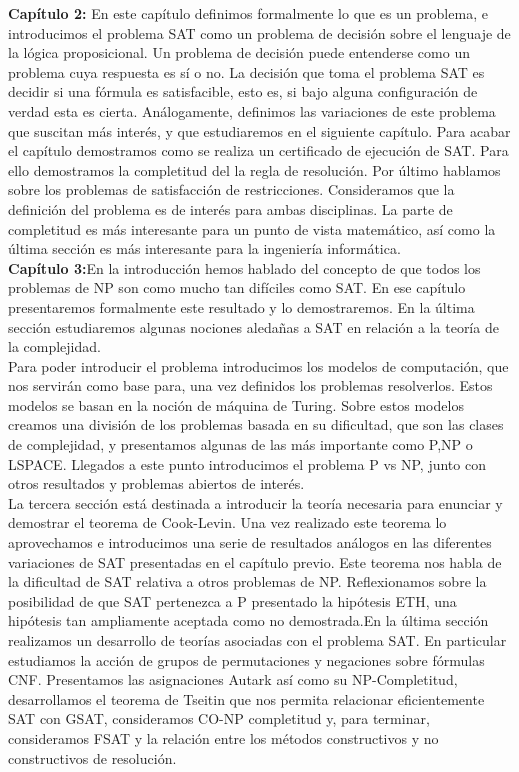\textbf{Capítulo 2:} En este capítulo definimos formalmente lo que es un problema, e introducimos el problema SAT como un problema de decisión sobre el lenguaje de la lógica proposicional. Un  problema de decisión puede entenderse como un problema cuya respuesta es sí o no. La decisión que toma el problema SAT es decidir si una fórmula es satisfacible, esto es, si bajo alguna configuración de verdad esta es cierta. Análogamente, definimos las variaciones de este problema que suscitan más interés, y que estudiaremos en el siguiente capítulo. Para acabar el capítulo demostramos como se realiza un certificado de ejecución de SAT. Para ello demostramos la completitud del la regla de resolución. Por último hablamos sobre los problemas de satisfacción de restricciones. Consideramos que la definición del problema es de interés para ambas disciplinas. La parte de completitud es más interesante para un punto de vista matemático, así como la última sección es más interesante para la ingeniería informática.\\

\textbf{Capítulo 3:}En la introducción hemos hablado del concepto de que todos los problemas de NP son como mucho tan difíciles como SAT. En ese capítulo presentaremos formalmente este resultado y lo demostraremos. En la última sección estudiaremos algunas nociones aledañas a SAT en relación a la teoría de la complejidad.\\

Para poder introducir el problema introducimos los modelos de computación, que nos servirán como base para, una vez definidos los problemas resolverlos. Estos modelos se basan en la noción de máquina de Turing. Sobre estos modelos creamos una división de los problemas basada en su dificultad, que son las clases de complejidad, y presentamos algunas de las más importante como P,NP o LSPACE. Llegados a este punto introducimos el problema P vs NP, junto con otros resultados y problemas abiertos de interés.\\


La tercera sección está destinada a introducir la teoría necesaria para enunciar y demostrar el teorema de Cook-Levin. Una vez realizado este teorema lo aprovechamos e  introducimos una serie de resultados análogos en las diferentes variaciones de SAT presentadas en el capítulo previo. Este teorema nos habla de la dificultad de SAT relativa a otros problemas de NP. Reflexionamos sobre la posibilidad de que SAT pertenezca a P presentado la hipótesis ETH, una hipótesis tan ampliamente aceptada como no demostrada.En la última sección realizamos un desarrollo de teorías asociadas con el problema SAT. En particular estudiamos la acción de grupos de permutaciones y negaciones sobre fórmulas CNF. Presentamos las asignaciones Autark así como su NP-Completitud, desarrollamos el teorema de Tseitin que nos permita relacionar eficientemente SAT con GSAT, consideramos CO-NP completitud y, para terminar, consideramos FSAT y la relación entre los métodos constructivos y no constructivos de resolución.\\

